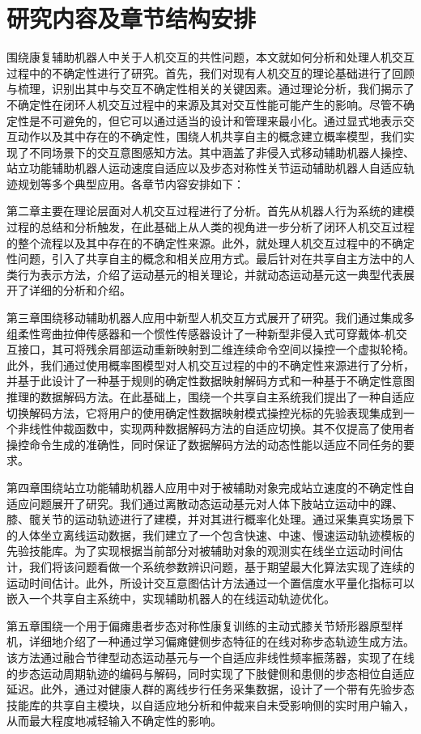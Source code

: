 \section{研究内容及章节结构安排}
围绕康复辅助机器人中关于人机交互的共性问题，本文就如何分析和处理人机交互过程中的不确定性进行了研究。首先，我们对现有人机交互的理论基础进行了回顾与梳理，识别出其中与交互不确定性相关的关键因素。通过理论分析，我们揭示了不确定性在闭环人机交互过程中的来源及其对交互性能可能产生的影响。尽管不确定性是不可避免的，但它可以通过适当的设计和管理来最小化。通过显式地表示交互动作以及其中存在的不确定性，围绕人机共享自主的概念建立概率模型，我们实现了不同场景下的交互意图感知方法。其中涵盖了非侵入式移动辅助机器人操控、站立功能辅助机器人运动速度自适应以及步态对称性关节运动辅助机器人自适应轨迹规划等多个典型应用。各章节内容安排如下：

第二章主要在理论层面对人机交互过程进行了分析。首先从机器人行为系统的建模过程的总结和分析触发，在此基础上从人类的视角进一步分析了闭环人机交互过程的整个流程以及其中存在的不确定性来源。此外，就处理人机交互过程中的不确定性问题，引入了共享自主的概念和相关应用方式。最后针对在共享自主方法中的人类行为表示方法，介绍了运动基元的相关理论，并就动态运动基元这一典型代表展开了详细的分析和介绍。

第三章围绕移动辅助机器人应用中新型人机交互方式展开了研究。我们通过集成多组柔性弯曲拉伸传感器和一个惯性传感器设计了一种新型非侵入式可穿戴体-机交互接口，其可将残余肩部运动重新映射到二维连续命令空间以操控一个虚拟轮椅。此外，我们通过使用概率图模型对人机交互过程的中的不确定性来源进行了分析，并基于此设计了一种基于规则的确定性数据映射解码方式和一种基于不确定性意图推理的数据解码方法。在此基础上，围绕一个共享自主系统我们提出了一种自适应切换解码方法，它将用户的使用确定性数据映射模式操控光标的先验表现集成到一个非线性仲裁函数中，实现两种数据解码方法的自适应切换。其不仅提高了使用者操控命令生成的准确性，同时保证了数据解码方法的动态性能以适应不同任务的要求。

第四章围绕站立功能辅助机器人应用中对于被辅助对象完成站立速度的不确定性自适应问题展开了研究。我们通过离散动态运动基元对人体下肢站立运动中的踝、膝、髋关节的运动轨迹进行了建模，并对其进行概率化处理。通过采集真实场景下的人体坐立离线运动数据，我们建立了一个包含快速、中速、慢速运动轨迹模板的先验技能库。为了实现根据当前部分对被辅助对象的观测实在线坐立运动时间估计，我们将该问题看做一个系统参数辨识问题，基于期望最大化算法实现了连续的运动时间估计。此外，所设计交互意图估计方法通过一个置信度水平量化指标可以嵌入一个共享自主系统中，实现辅助机器人的在线运动轨迹优化。

第五章围绕一个用于偏瘫患者步态对称性康复训练的主动式膝关节矫形器原型样机，详细地介绍了一种通过学习偏瘫健侧步态特征的在线对称步态轨迹生成方法。该方法通过融合节律型动态运动基元与一个自适应非线性频率振荡器，实现了在线的步态运动周期轨迹的编码与解码，同时实现了下肢健侧和患侧的步态相位自适应延迟。此外，通过对健康人群的离线步行任务采集数据，设计了一个带有先验步态技能库的共享自主模块，以自适应地分析和仲裁来自未受影响侧的实时用户输入，从而最大程度地减轻输入不确定性的影响。

